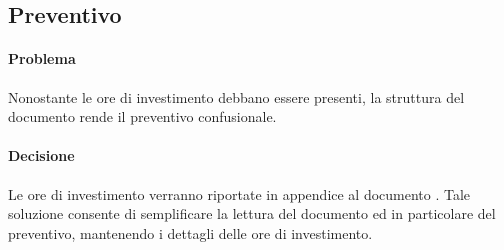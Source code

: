 \subsection{Preventivo}
\paragraph{Problema} Nonostante le ore di investimento debbano essere presenti, la struttura del documento rende il preventivo confusionale.
\paragraph{Decisione} Le ore di investimento verranno riportate in appendice al documento \PP. Tale soluzione consente di semplificare la lettura del documento ed in particolare del preventivo, mantenendo i dettagli delle ore di investimento.
